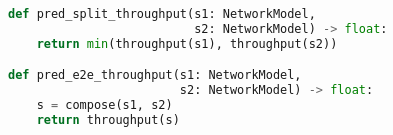 \begin{lstfloat}[t]
\begin{lstlisting}[language=Python]
def pred_split_throughput(s1: NetworkModel,
                          s2: NetworkModel) -> float:
    return min(throughput(s1), throughput(s2))

def pred_e2e_throughput(s1: NetworkModel,
                        s2: NetworkModel) -> float:
    s = compose(s1, s2)
    return throughput(s)
\end{lstlisting}
\label{lst:splitting:pred-throughput-api}
\end{lstfloat}
